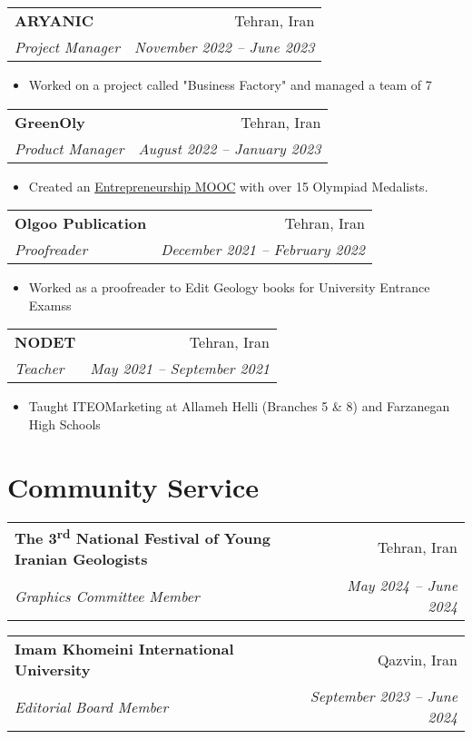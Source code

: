 \documentclass[letterpaper,11pt]{article}
\makeatletter
\newcommand{\resitem}[1]{\item #1 \vspace{-2pt}}
\newcommand{\ressubheading}[4]{
	\begin{tabular*}{6.5in}{l@{\cftdotfill{\cftsecdotsep}\extracolsep{\fill}}r}
		\textbf{#1} & #2 \\
		\textit{#3} & \textit{#4} \\
	\end{tabular*}\vspace{-8pt}
}
\makeatother
\begin{document}
	\ressubheading{ARYANIC}{Tehran, Iran}{Project Manager}{November 2022 – June 2023}
	\begin{itemize}[topsep=7.5pt,partopsep=0pt,itemsep=3.5pt,parsep=0pt]
		\resitem{Worked on a project called "Business Factory" and managed a team of 7}
	\end{itemize}
		\vspace{-0.50em} 
	\ressubheading{GreenOly}{Tehran, Iran}{Product Manager}{August 2022 – January 2023}
	\begin{itemize}[topsep=7.5pt,partopsep=0pt,itemsep=3.5pt,parsep=0pt]
		\resitem{Created an \href{https://aradfarahani.com/MOOC/}{Entrepreneurship MOOC} with over 15 Olympiad Medalists.}
	\end{itemize}
		\vspace{-0.50em}
	\ressubheading{Olgoo Publication }{Tehran, Iran}{Proofreader}{December 2021 – February 2022}
    \begin{itemize}[topsep=7.5pt,partopsep=0pt,itemsep=3.5pt,parsep=0pt]
	\resitem{Worked as a proofreader to Edit Geology books for University Entrance Examss}
    \end{itemize}
    \vspace{-0.50em} 
    \ressubheading{NODET\footnotemark[2]}{Tehran, Iran}{Teacher}{May 2021 – September 2021}
    \begin{itemize}[topsep=7.5pt, partopsep=0pt, itemsep=3.5pt, parsep=0pt]
	\resitem{Taught ITEO\footnotemark[3] Marketing at Allameh Helli (Branches 5 \& 8) and Farzanegan High Schools}
    \end{itemize}
         \vspace{-1em}

		
	
	
	\section{Community Service}
	\ressubheading{The 3\textsuperscript{rd} National Festival of Young Iranian Geologists}{Tehran, Iran}{Graphics Committee Member}{May 2024 – June 2024}
	
	\vspace{0.99em} 
	
	\ressubheading{Imam Khomeini International University}{Qazvin, Iran}{Editorial Board Member}{September 2023 – June 2024}
	
\end{document}
